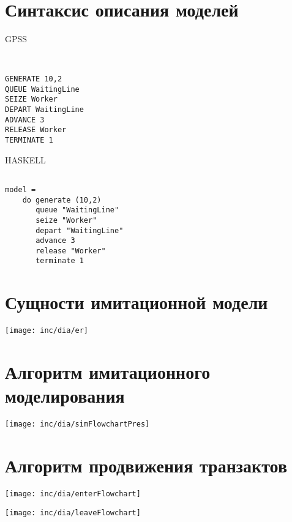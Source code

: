 \documentclass[12pt]{article}
\begin{document}
\section{Синтаксис описания моделей}

\begin{minipage}[m]{.49\textwidth}
\centerline{GPSS}

\begin{verbatim}


GENERATE 10,2
QUEUE WaitingLine
SEIZE Worker
DEPART WaitingLine
ADVANCE 3
RELEASE Worker
TERMINATE 1

\end{verbatim}


\end{minipage}
%
\begin{minipage}[m]{.49\textwidth}
\vspace{1cm}
\centerline{HASKELL}

\begin{verbatim}

model = 
    do generate (10,2)
       queue "WaitingLine"
       seize "Worker"
       depart "WaitingLine"
       advance 3
       release "Worker"
       terminate 1

\end{verbatim}

\end{minipage}


\section{Сущности имитационной модели}

\texttt{[image: inc/dia/er]}


\section{Алгоритм имитационного моделирования}
\centering
\texttt{[image: inc/dia/simFlowchartPres]}

\section{Алгоритм продвижения транзактов}
\begin{minipage}[m]{.49\textwidth}
\texttt{[image: inc/dia/enterFlowchart]}
\end{minipage}
\begin{minipage}[m]{.49\textwidth}
\texttt{[image: inc/dia/leaveFlowchart]}
\end{minipage}
\end{document}

